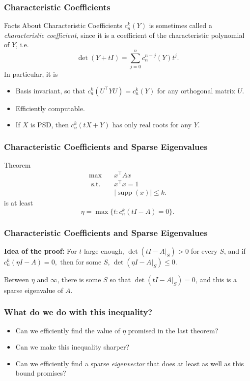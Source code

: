 \documentclass{beamer}
\DeclareMathOperator*{\supp}{supp}
\newcommand{\st}{{\text{ s.t. }}}
\begin{document}
\begin{frame}
    \frametitle{Characteristic Coefficients}
    \begin{block}{Facts About Characteristic Coefficients}
        $c_n^k(Y)$ is sometimes called a \emph{characteristic coefficient}, since it is a coefficient of the characteristic polynomial of $Y$, i.e.
        \[
            \det(Y + tI) = \sum_{j=0}^n c_n^{n-j}(Y) t^j.
        \]
        \pause
        In particular, it is
        \begin{itemize}
            \item Basis invariant, so that $c_n^k(U^{\intercal} Y U) = c_n^k(Y)$ for any orthogonal matrix $U$.
            \pause
            \item Efficiently computable.
            \pause
            \item If $X$ is PSD, then $c_n^k(tX+Y)$ has only real roots for any $Y$.
        \end{itemize}
    \end{block}
\end{frame}
\begin{frame}
    \frametitle{Characteristic Coefficients and Sparse Eigenvalues}
    \begin{block}{Theorem}
        \begin{equation*}
            \begin{aligned}
                \max\quad & x^{\intercal}Ax\\
                \st & x^{\intercal}x = 1\\
                    &|\supp(x)| \le k.
            \end{aligned}
        \end{equation*}
        is at least 
        \[
            \eta = \max \{t : c_n^k(tI - A) = 0 \}.
        \]
    \end{block}
\end{frame}
\begin{frame}
    \frametitle{Characteristic Coefficients and Sparse Eigenvalues}
    \textbf{Idea of the proof:} For $t$ large enough, $\det(tI - A|_S) > 0$ for every $S$, and if $c_n^k(\eta I - A) = 0,$ then for some $S$, $\det(\eta I-A|_S) \le 0$.

    Between $\eta$ and $\infty$, there is some $S$ so that $\det(tI- A|_S) = 0$, and this is a sparse eigenvalue of $A$.
\end{frame}
\begin{frame}
    \frametitle{What do we do with this inequality?}
    \begin{itemize}
        \item Can we efficiently find the value of $\eta$ promised in the last theorem?
        \item Can we make this inequality sharper?
        \item Can we efficiently find a sparse \emph{eigenvector} that does at least as well as this bound promises?
    \end{itemize}
\end{frame}
\end{document}
